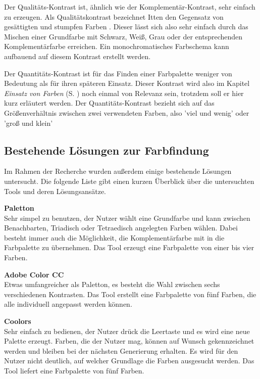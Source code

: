 Der Qualitäts-Kontrast ist, ähnlich wie der Komplementär-Kontrast, sehr einfach zu erzeugen. Als Qualitätskontrast bezeichnet Itten den Gegensatz von gesättigten und stumpfen Farben \cite[S. 55]{Itten201006}. Dieser lässt sich also sehr einfach durch das Mischen einer Grundfarbe mit Schwarz, Weiß, Grau oder der entsprechenden Komplementärfarbe erreichen.
Ein monochromatisches Farbschema kann aufbauend auf diesem Kontrast erstellt werden.

Der Quantitäts-Kontrast ist für das Finden einer Farbpalette weniger von Bedeutung als für ihren späteren Einsatz. Dieser Kontrast wird also im Kapitel \textit{Einsatz von Farben} (S. \pageref{einsatz}) noch einmal von Relevanz sein, trotzdem soll er hier kurz erläutert werden. Der Quantitäts-Kontrast bezieht sich auf das Größenverhältnis zwischen zwei verwendeten Farben, also 'viel und wenig' oder 'groß und klein' \cite[S. 59]{Itten201006}


\subsection{Bestehende Lösungen zur Farbfindung}
Im Rahmen der Recherche wurden außerdem einige bestehende Lösungen untersucht. Die folgende Liste gibt einen kurzen Überblick über die untersuchten Tools und deren Lösungsansätze.

\textbf{Paletton} \\
Sehr simpel zu benutzen, der Nutzer wählt eine Grundfarbe und kann zwischen Benachbarten, Triadisch oder Tetraedisch angelegten Farben wählen. Dabei besteht immer auch die Möglichkeit, die Komplementärfarbe mit in die Farbpalette zu übernehmen. Das Tool erzeugt eine Farbpalette von einer bis vier Farben.

\textbf{Adobe Color CC} \\
Etwas umfangreicher als Paletton, es besteht die Wahl zwischen sechs verschiedenen Kontrasten. Das Tool erstellt eine Farbpalette von fünf Farben, die alle individuell angepasst werden können.

\textbf{Coolors} \\
Sehr einfach zu bedienen, der Nutzer drück die Leertaste und es wird eine neue Palette erzeugt. Farben, die der Nutzer mag, können auf Wunsch gekennzeichnet werden und bleiben bei der nächsten Generierung erhalten. Es wird für den Nutzer nicht deutlich, auf welcher Grundlage die Farben ausgesucht werden. Das Tool liefert eine Farbpalette von fünf Farben.

